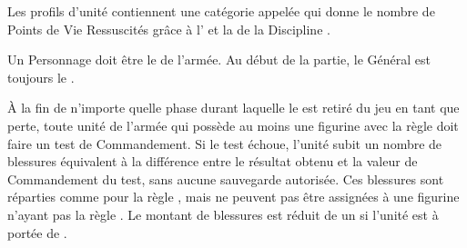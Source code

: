 \newcommand{\greatmonstrousrevenantrule}{%
Le \monstrousrevenant{} gagne \thunderouscharge{} et sa taille de socle change en \unit{60x100}{\milli\meter}.
}

\newcommand{\colossalzombiedragonrule}{%
La figurine gagne +1 en Capacité de Combat, la valeur de sa \innatedefence{} passe à ($ 3+ $), et sa taille de socle change en \unit{100x150}{\milli\meter}.
}

\newcommand{\discordantchorusrule}{%
Dans une armée contenant une \shriekinghorror{} montée, les \shriekinghorrors{} non montées suivent la règle \oneofakind{}.
}


\newcommand{\QRSnote}{%
\noindent$^{1}$ En Monture, le Personnage remplace le \cadavermaster{}.

\noindent$^{2}$ En Monture, le Personnage remplace une \paramour{}.
}









\startarmywiderules

\armywideruleentry{\invocation}

Les profils d'unité contiennent une catégorie appelée \invocation{} qui donne le nombre de Points de Vie Ressuscités grâce à l'\necromancysignaturespell{} et la \necromancyspellfour{} de la Discipline \necromancy{}.

\armywideruleentry{\masterofundeath}

Un Personnage doit être le \textbf{\master{}} de l'armée. Au début de la partie, le Général est toujours le \master{}.

\closearmywiderules

\vspace*{1.5cm}
\startarmyspecialrules

\armyspecialruleentry{\ashestoashes}

À la fin de n'importe quelle phase durant laquelle le \master{} est retiré du jeu en tant que perte, toute unité de l'armée qui possède au moins une figurine avec la règle \ashestoashes{} doit faire un test de Commandement. Si le test échoue, l'unité subit un nombre de blessures équivalent à la différence entre le résultat obtenu et la valeur de Commandement du test, sans aucune sauvegarde autorisée. Ces blessures sont réparties comme pour la règle \unstable{}, mais ne peuvent pas être assignées à une figurine n'ayant pas la règle \ashestoashes{}. Le montant de blessures est réduit de un si l'unité est à portée de \holdyourground{}.

